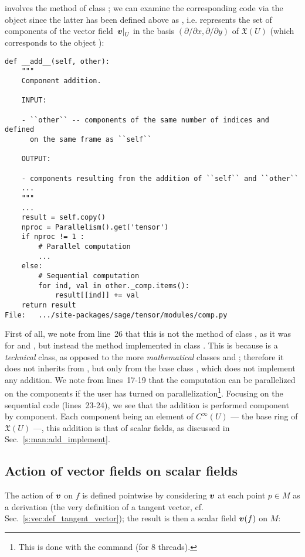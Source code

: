 involves the method  of class ; we
can examine the corresponding code via the object  since the
latter has been defined above as , i.e.
 represents the set of components of the vector field
$\left. \bm{v}\right| _U$ in the basis $(\partial/\partial x, \partial/\partial y)$
of $\mathfrak{X}(U)$ (which corresponds to the object ):
\begin{lstlisting}
def __add__(self, other):
    """
    Component addition.

    INPUT:

    - ``other`` -- components of the same number of indices and defined
      on the same frame as ``self``

    OUTPUT:

    - components resulting from the addition of ``self`` and ``other``
    ...
    """
    ...
    result = self.copy()
    nproc = Parallelism().get('tensor')
    if nproc != 1 :
        # Parallel computation
        ...
    else:
        # Sequential computation
        for ind, val in other._comp.items():
            result[[ind]] += val
    return result
File:   .../site-packages/sage/tensor/modules/comp.py
\end{lstlisting}
First of all, we note from line~26
that this is not the method  of class ,
as it was for  and ,
but instead the method  implemented
in class . This is because  is a
\emph{technical} class, as opposed to the more \emph{mathematical} classes
 and ; therefore it does not
inherits from , but only from the base class ,
which does not implement any addition.
We note from lines~17-19 that the computation can be parallelized on the
components if the user has turned on parallelization\footnote{This is done with the command
 (for 8 threads).}. Focusing on the sequential code
(lines~23-24), we see that the addition is
performed component by component. Each component being an element of
$C^\infty(U)$ --- the base ring of $\mathfrak{X}(U)$ ---, this addition is that
of scalar fields, as discussed in Sec.~\ref{s:man:add_implement}.

\subsection{Action of vector fields on scalar fields} \label{s:vec:action_on_scalar}

The action of $\bm{v}$ on $f$ is defined pointwise by
considering $\bm{v}$ at each point $p\in M$ as a derivation (the very definition of a tangent vector, cf. Sec.~\ref{s:vec:def_tangent_vector}); the result is then a
scalar field $\bm{v}(f)$ on $M$:
